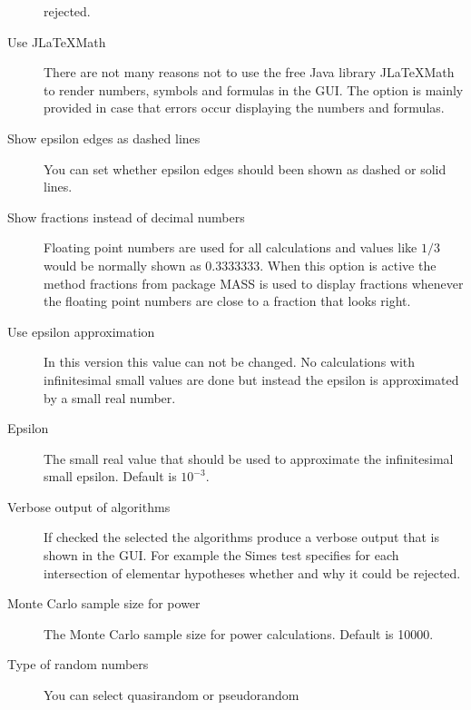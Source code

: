 \documentclass[a4paper, 10pt]{article}\usepackage[]{graphicx}\usepackage[]{color}
\numberwithin{equation}{section}
\theoremstyle{definition}
\theoremstyle{plain}
\begin{document}
\begin{description}
    rejected.
  \item[Use JLaTeXMath] There are not many reasons not to use the free Java
    library JLaTeXMath to render numbers, symbols and formulas in the
    GUI. The option is mainly provided in case that errors occur
    displaying the numbers and formulas.
  \item[Show epsilon edges as dashed lines] You can set whether epsilon
    edges should been shown as dashed or solid lines.
  \item[Show fractions instead of decimal numbers] Floating point numbers are used
    for all calculations and values like $1/3$ would be normally shown as
    $0.3333333$. When this option is active the method fractions from package
    MASS is used to display fractions whenever the floating point numbers are
    close to a fraction that looks right.  
  \item[Use epsilon approximation] In this version this value can not be
    changed. No calculations with infinitesimal small values are done but
    instead the epsilon is approximated by a small real number.
  \item[Epsilon] The small real value that should be used to approximate
    the infinitesimal small epsilon. Default is $10^{-3}$.
  \item[Verbose output of algorithms] If checked the selected the algorithms produce a
  verbose output that is shown in the GUI. For example the Simes test specifies
  for each intersection of elementar hypotheses whether and why it could be
  rejected.
  \item[Monte Carlo sample size for power] The Monte Carlo sample size for power
  calculations. Default is 10000.
  \item[Type of random numbers] You can select quasirandom or pseudorandom

\end{description}
\end{document}

